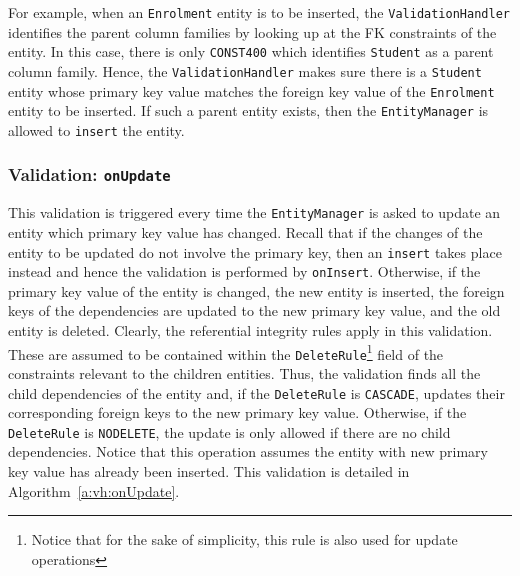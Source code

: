 	 	
For example,  when an \texttt{Enrolment} entity is to be inserted,   the
 \texttt{Validation\-Handler} identifies the parent column families  by looking up
 at the \ac{FK} constraints of the entity. In this case, there
 is only \texttt{CONST400} which identifies \texttt{Student} as a parent column
 family. Hence, the \texttt{ValidationHandler} makes sure there is a
 \texttt{Student} entity whose primary key value matches the foreign key value
 of the \texttt{Enrolment} entity to be inserted. If such a parent entity
 exists, then the \texttt{EntityManager} is allowed to \texttt{insert} the entity.
		
		
	\subsubsection{Validation: \texttt{onUpdate}}
		This validation is triggered every time the \texttt{EntityManager} is asked to
		update an entity which primary key value has changed. Recall that if the changes
		of the entity to  be updated do not involve the primary key, then an
		\texttt{insert} takes place instead and hence the validation is performed by
		\texttt{onInsert}. Otherwise, if the primary key value of the entity is changed,
		the new entity is  inserted, the foreign keys of the dependencies are updated to
		the new primary key value, and the old entity is deleted. Clearly, the
		referential integrity rules apply in this validation. These are assumed to be
		contained within the  \texttt{DeleteRule}\footnote{Notice that for the sake of
		simplicity, this rule is also used for update operations} field of the
		constraints relevant to the children entities.  Thus, the validation finds all
		the child dependencies of the entity and, if the \texttt{DeleteRule} is
		\texttt{CASCADE}, updates their corresponding foreign keys to the new primary
		key value. Otherwise, if the \texttt{DeleteRule} is \texttt{NODELETE}, the
		update is only allowed if there are no child dependencies. Notice that this
		operation assumes the entity with new primary key value has already been
		inserted. This validation is detailed in Algorithm~\ref{a:vh:onUpdate}.
		
